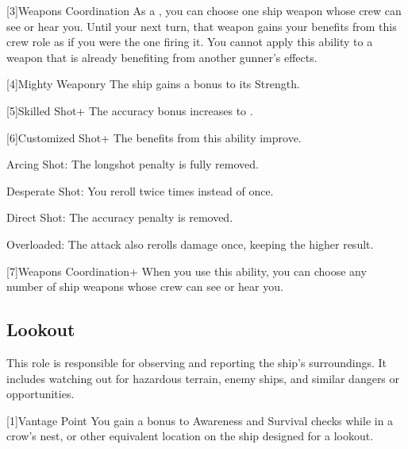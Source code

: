     [3]{Weapons Coordination} As a , you can choose one ship weapon whose crew can see or hear you.
      Until your next turn, that weapon gains your benefits from this crew role as if you were the one firing it.
      You cannot apply this ability to a weapon that is already benefiting from another gunner's effects.

    [4]{Mighty Weaponry} The ship gains a  bonus to its Strength.

    [5]{Skilled Shot+} The accuracy bonus increases to .

    [6]{Customized Shot+} The benefits from this ability improve.
      \begin{raggeditemize}
        \item Arcing Shot: The longshot penalty is fully removed.
        \item Desperate Shot: You reroll twice times instead of once.
        \item Direct Shot: The accuracy penalty is removed.
        \item Overloaded: The attack also rerolls damage once, keeping the higher result.
      \end{raggeditemize}

    [7]{Weapons Coordination+} When you use this ability, you can choose any number of ship weapons whose crew can see or hear you.

  \subsection{Lookout}
    This role is responsible for observing and reporting the ship's surroundings.
    It includes watching out for hazardous terrain, enemy ships, and similar dangers or opportunities.

    [1]{Vantage Point} You gain a  bonus to Awareness and Survival checks while in a crow's nest, or other equivalent location on the ship designed for a lookout.

